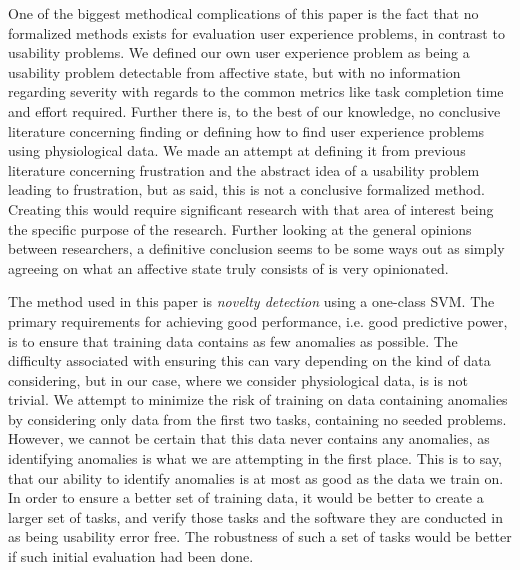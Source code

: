 One of the biggest methodical complications of this paper is the fact that no formalized methods exists for evaluation
user experience problems, in contrast to usability problems. We defined our own user experience problem as being a
usability problem detectable from affective state, but with no information regarding severity with regards to the common
metrics like task completion time and effort required. Further there is, to the best of our knowledge, no conclusive
literature concerning finding or defining how to find user experience problems using physiological data. We made an
attempt at defining it from previous literature concerning frustration and the abstract idea of a usability problem
leading to frustration, but as said, this is not a conclusive formalized method. Creating this would require significant
research with that area of interest being the specific purpose of the research. Further looking at the general opinions
between researchers, a definitive conclusion seems to be some ways out as simply agreeing on what an affective state
truly consists of is very opinionated.

The method used in this paper is \textit{novelty detection} using a one-class SVM. The primary requirements for
achieving good performance, i.e. good predictive power, is to ensure that training data contains as few anomalies as
possible. The difficulty associated with ensuring this can vary depending on the kind of data considering, but in our
case, where we consider physiological data, is is not trivial. We attempt to minimize the risk of
training on data containing anomalies by considering only data from the first two tasks, containing no seeded
problems. However, we cannot be certain that this data never contains any anomalies, as identifying anomalies is what we
are attempting in the first place. This is to say, that our ability to identify anomalies is at most as good as the data
we train on. In order to ensure a better set of training data, it would be better to create a larger set of tasks, and verify those tasks and the software they are conducted in as being usability error free. 
The robustness of such a set of tasks would be better if such initial evaluation had been done.

